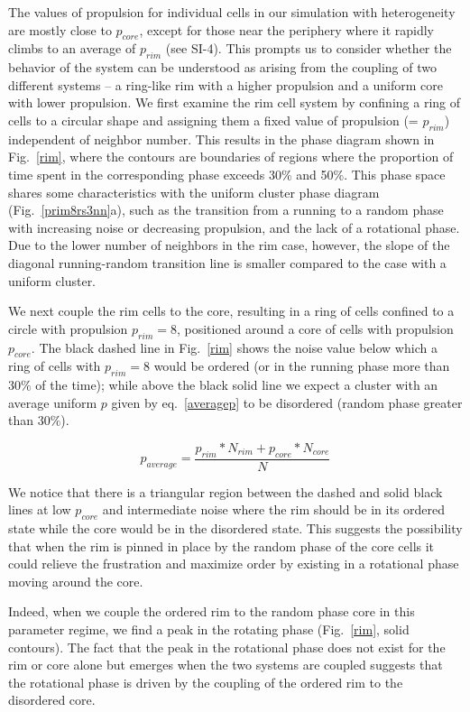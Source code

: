 \documentclass{article}
\begin{document}
The values of propulsion for individual cells in our simulation with heterogeneity are mostly close to $p_{core}$, except for those near the periphery where it rapidly climbs to an average of $p_{rim}$ (see SI-4). This prompts us to  consider whether the behavior of the system can be understood as arising from the coupling of two different systems -- a ring-like rim with a higher propulsion and a uniform core with lower propulsion. We first examine the rim cell system by confining a ring of cells to a circular shape and assigning them a fixed value of propulsion (= $p_{rim}$) independent of neighbor number. This results in the phase diagram shown in Fig.~\ref{rim}, where the contours are boundaries of regions where the proportion of time spent in the corresponding phase exceeds 30\% and 50\%. This phase space shares some characteristics with the uniform cluster phase diagram (Fig.~\ref{prim8rs3nn}a), such as the transition from a running to a random phase with increasing noise or decreasing propulsion, and the lack of a rotational phase. Due to the lower number of neighbors in the rim case, however, the slope of the diagonal running-random transition line is smaller compared to the case with a uniform cluster.

We next couple the rim cells to the core, resulting in a ring of cells confined to a circle with propulsion $p_{rim}= 8$, positioned around a core of cells with propulsion $p_{core}$. The black dashed line in Fig.~\ref{rim} shows the noise value below which a ring of cells with $p_{rim}=8$ would be ordered (or in the running phase more than $30\%$ of the time); while above the black solid line we expect a cluster with an average uniform $p$ given by eq.~\ref{averagep} to be disordered (random phase greater than $30\%$).  

\begin{equation}
p_{average} = \frac{p_{rim}*N_{rim}+p_{core}*N_{core}}{N}
\label{averagep}
\end{equation}

We notice that there is a triangular region between the dashed and solid black lines at low $p_{core}$ and intermediate noise where the rim should be in its ordered state while the core would be in the disordered state.  This suggests the possibility that when the rim is pinned in place by the random phase of the core cells it could relieve the frustration and maximize order by existing in a rotational phase moving around the core.

Indeed, when we couple the ordered rim to the random phase core in this parameter regime, we find a peak in the rotating phase (Fig.~\ref{rim}, solid contours).  The fact that the peak in the rotational phase does not exist for the rim or core alone but emerges when the two systems are coupled suggests that the rotational phase is driven by the coupling of the ordered rim to the disordered core.
\end{document}
